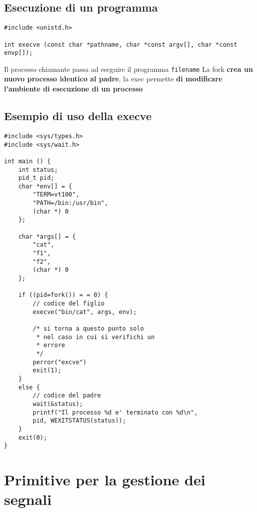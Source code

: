 \documentclass[italian,12pt,a4paper]{article}
\begin{document}
\subsection{Esecuzione di un programma}
\begin{verbatim}
#include <unistd.h>

int execve (const char *pathname, char *const argv[], char *const envp[]);
\end{verbatim}
Il processo chiamante passa ad eseguire il programma \verb|filename|
La fork \textbf{crea un nuovo processo identico al padre}, la exec permette \textbf{di modificare l'ambiente di esecuzione di un processo}
\subsection{Esempio di uso della execve}
\begin{lstlisting}
#include <sys/types.h>
#include <sys/wait.h>

int main () {
	int status;
	pid_t pid;
	char *env[] = {
		"TERM=vt100",
		"PATH=/bin:/usr/bin",
		(char *) 0
	};
	
	char *args[] = {
		"cat",
		"f1",
		"f2",
		(char *) 0
	}; 
	
	if ((pid=fork()) = = 0) {
		// codice del figlio
		execve("bin/cat", args, env);
		
		/* si torna a questo punto solo
		 * nel caso in cui si verifichi un
		 * errore
		 */
		perror("excve")
		exit(1);
	}
	else {
		// codice del padre
		wait(&status);
		printf("Il processo %d e' terminato con %d\n", 
		pid, WEXITSTATUS(status));
	}
	exit(0);
}
\end{lstlisting}
\section{Primitive per la gestione dei segnali}


\newpage
\listoffigures
\end{document}
